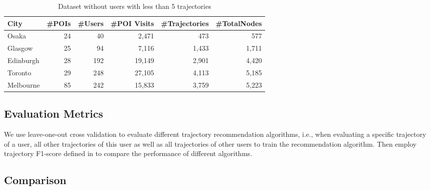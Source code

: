 \begin{table*}
\centering
\caption{Dataset without users with less than 5 trajectories}
\label{table:data:nofew}
\begin{tabular}{lrrrrr} \hline
\textbf{City} & \textbf{\#POIs} & \textbf{\#Users} & \textbf{\#POI Visits} & \textbf{\#Trajectories} & \textbf{\#TotalNodes} \\ \hline
Osaka & 24 & 40 & 2,471 & 473 & 577 \\ 
Glasgow & 25 & 94 & 7,116 & 1,433 & 1,711 \\ 
Edinburgh & 28 & 192 & 19,149 & 2,901 & 4,420 \\ 
Toronto & 29 & 248 & 27,105 & 4,113 & 5,185 \\ 
Melbourne & 85 & 242 & 15,833 & 3,759 & 5,223 \\ 
\hline
\end{tabular}
\end{table*}


\subsection{Evaluation Metrics}
\label{experiment:metric}
We use leave-one-out cross validation to evaluate different trajectory recommendation algorithms,
i.e., when evaluating a specific trajectory of a user, all other trajectories of this user as well as 
all trajectories of other users to train the recommendation algorithm.
Then employ trajectory F1-score defined in \cite{ijcai15} to compare the performance of different algorithms.


\subsection{Comparison}
\label{experiment:comparison}

